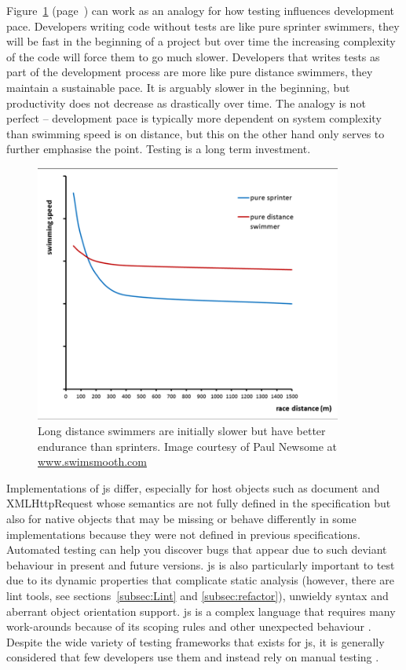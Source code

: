 \documentclass[11pt]{article}
\begin{document}
Figure~\ref{fig:distance} (page~\pageref{fig:distance}) can work as an analogy for how testing influences development pace. Developers writing code without tests are like pure sprinter swimmers, they will be fast in the beginning of a project but over time the increasing complexity of the code will force them to go much slower. Developers that writes tests as part of the development process are more like pure distance swimmers, they maintain a sustainable pace. It is arguably slower in the beginning, but productivity does not decrease as drastically over time. The analogy is not perfect -- development pace is typically more dependent on system complexity than swimming speed is on distance, but this on the other hand only serves to further emphasise the point. Testing is a long term investment.

\begin{figure}[ht]
\centering
\includegraphics[width=0.9\textwidth]{pics/distance.png}
\caption{Long distance swimmers are initially slower but have better endurance than sprinters. Image courtesy of Paul Newsome at \small \url{www.swimsmooth.com}}
\label{fig:distance}
\end{figure}

Implementations of \gls{js} differ, especially for host objects such as document and XMLHttpRequest whose semantics are not fully defined in the specification but also for native objects that may be missing or behave differently in some implementations because they were not defined in previous specifications. Automated testing can help you discover bugs that appear due to such deviant behaviour in present and future versions. \gls{js} is also particularly important to test due to its dynamic properties \cite{AutomatedTesting} that complicate static analysis (however, there are lint tools, see sections~\ref{subsec:Lint} and \ref{subsec:refactor}), unwieldy syntax and aberrant object orientation support. \gls{js} is a complex language that requires many work-arounds because of its scoping rules and other unexpected behaviour \cite[appendix A]{GoodParts}. Despite the wide variety of testing frameworks that exists for \gls{js}, it is generally considered that few developers use them and instead rely on manual testing \cite{AutomatedTesting}.
\end{document}
